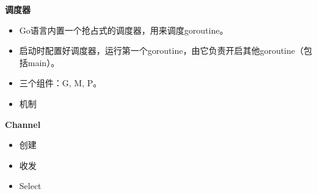 \documentclass{beamer}
\begin{document}
\begin{frame}{\bf 调度器}

\begin{itemize}
\pause
\item Go语言内置一个抢占式的调度器，用来调度goroutine。
\pause
\item 启动时配置好调度器，运行第一个goroutine，由它负责开启其他goroutine（包
括main）。
\pause
\item 三个组件：G, M, P。
\pause
\item 机制
\end{itemize}

\end{frame}

\begin{frame}{\bf Channel}

\begin{itemize}
\pause
\item 创建
\pause
\item 收发
\pause
\item Select
\end{itemize}

\end{frame}
\end{document}
